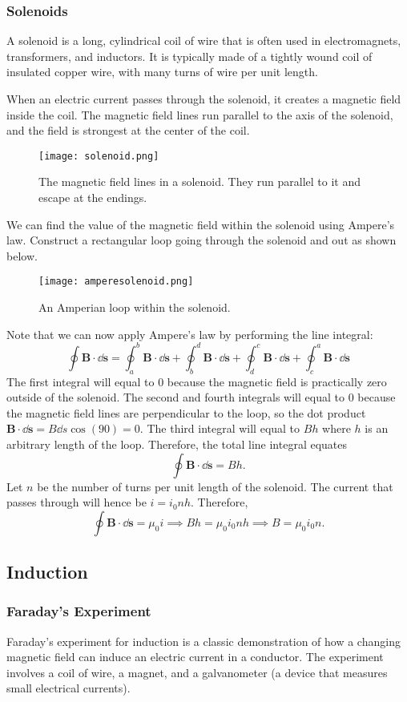 \documentclass[12pt]{article}
\let\vec\mathbf
\begin{document}
  \subsubsection{Solenoids}
  A solenoid is a long, cylindrical coil of wire that is often used in electromagnets, transformers, and inductors. It is typically made of a tightly wound coil of insulated copper wire, with many turns of wire per unit length.

When an electric current passes through the solenoid, it creates a magnetic field inside the coil. The magnetic field lines run parallel to the axis of the solenoid, and the field is strongest at the center of the coil.
    \begin{figure}[H]
  \centering
      \texttt{[image: solenoid.png]}
      \caption{The magnetic field lines in a solenoid. They run parallel to it and escape at the endings.}
  \end{figure}
We can find the value of the magnetic field within the solenoid using Ampere's law. Construct a rectangular loop going through the solenoid and out as shown below. 
    \begin{figure}[H]
  \centering
      \texttt{[image: amperesolenoid.png]}
      \caption{An Amperian loop within the solenoid.}
  \end{figure}
  Note that we can now apply Ampere's law by performing the line integral:
  \[\oint \vec B \cdot \dd \vec s = \oint_a^b \vec B \cdot \dd \vec s+ \oint_b^d  \vec B \cdot \dd \vec s+ \oint_d^c \vec B \cdot \dd \vec s+ \oint_c^a\vec B \cdot \dd \vec s\]
  The first integral will equal to $0$ because the magnetic field is practically zero outside of the solenoid. The second and fourth integrals will equal to $0$ because the magnetic field lines are perpendicular to the loop, so the dot product $\vec B \cdot \dd \vec s = B\dd s\cos (90) = 0$. The third integral will equal to $Bh$ where $h$ is an arbitrary length of the loop. Therefore, the total line integral equates
  \[\oint \vec B \cdot \dd \vec s = Bh.\]
  Let $n$ be the number of turns per unit length of the solenoid. The current that passes through will hence be $i = i_0 nh$. Therefore, 
  \[\oint \vec B \cdot \dd \vec s = \mu_0 i \implies Bh = \mu_0 i_0 nh \implies B = \mu_0 i_0 n.\]
  \subsection{Induction}
  \subsubsection{Faraday's Experiment}
  Faraday's experiment for induction is a classic demonstration of how a changing magnetic field can induce an electric current in a conductor. The experiment involves a coil of wire, a magnet, and a galvanometer (a device that measures small electrical currents).
\end{document}
